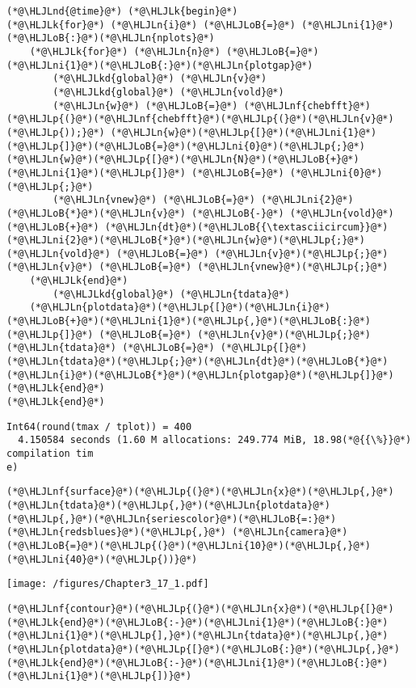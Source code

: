 \documentclass[12pt,a4paper]{article}
\newcommand{\HLJLk}[1]{\textcolor[RGB]{148,91,176}{\textbf{#1}}}
\newcommand{\HLJLkd}[1]{\textcolor[RGB]{214,102,97}{\textit{#1}}}
\newcommand{\HLJLn}[1]{#1}
\newcommand{\HLJLnd}[1]{\textcolor[RGB]{214,102,97}{#1}}
\newcommand{\HLJLnf}[1]{\textcolor[RGB]{66,102,213}{#1}}
\newcommand{\HLJLni}[1]{\textcolor[RGB]{59,151,46}{#1}}
\newcommand{\HLJLoB}[1]{\textcolor[RGB]{102,102,102}{\textbf{#1}}}
\newcommand{\HLJLp}[1]{#1}
\begin{document}
\begin{lstlisting}
(*@\HLJLnd{@time}@*) (*@\HLJLk{begin}@*)
(*@\HLJLk{for}@*) (*@\HLJLn{i}@*) (*@\HLJLoB{=}@*) (*@\HLJLni{1}@*)(*@\HLJLoB{:}@*)(*@\HLJLn{nplots}@*)
    (*@\HLJLk{for}@*) (*@\HLJLn{n}@*) (*@\HLJLoB{=}@*) (*@\HLJLni{1}@*)(*@\HLJLoB{:}@*)(*@\HLJLn{plotgap}@*)
        (*@\HLJLkd{global}@*) (*@\HLJLn{v}@*)
        (*@\HLJLkd{global}@*) (*@\HLJLn{vold}@*)
        (*@\HLJLn{w}@*) (*@\HLJLoB{=}@*) (*@\HLJLnf{chebfft}@*)(*@\HLJLp{(}@*)(*@\HLJLnf{chebfft}@*)(*@\HLJLp{(}@*)(*@\HLJLn{v}@*)(*@\HLJLp{));}@*) (*@\HLJLn{w}@*)(*@\HLJLp{[}@*)(*@\HLJLni{1}@*)(*@\HLJLp{]}@*)(*@\HLJLoB{=}@*)(*@\HLJLni{0}@*)(*@\HLJLp{;}@*) (*@\HLJLn{w}@*)(*@\HLJLp{[}@*)(*@\HLJLn{N}@*)(*@\HLJLoB{+}@*)(*@\HLJLni{1}@*)(*@\HLJLp{]}@*) (*@\HLJLoB{=}@*) (*@\HLJLni{0}@*)(*@\HLJLp{;}@*)
        (*@\HLJLn{vnew}@*) (*@\HLJLoB{=}@*) (*@\HLJLni{2}@*)(*@\HLJLoB{*}@*)(*@\HLJLn{v}@*) (*@\HLJLoB{-}@*) (*@\HLJLn{vold}@*) (*@\HLJLoB{+}@*) (*@\HLJLn{dt}@*)(*@\HLJLoB{{\textasciicircum}}@*)(*@\HLJLni{2}@*)(*@\HLJLoB{*}@*)(*@\HLJLn{w}@*)(*@\HLJLp{;}@*) (*@\HLJLn{vold}@*) (*@\HLJLoB{=}@*) (*@\HLJLn{v}@*)(*@\HLJLp{;}@*) (*@\HLJLn{v}@*) (*@\HLJLoB{=}@*) (*@\HLJLn{vnew}@*)(*@\HLJLp{;}@*)
    (*@\HLJLk{end}@*)
        (*@\HLJLkd{global}@*) (*@\HLJLn{tdata}@*)
    (*@\HLJLn{plotdata}@*)(*@\HLJLp{[}@*)(*@\HLJLn{i}@*)(*@\HLJLoB{+}@*)(*@\HLJLni{1}@*)(*@\HLJLp{,}@*)(*@\HLJLoB{:}@*)(*@\HLJLp{]}@*) (*@\HLJLoB{=}@*) (*@\HLJLn{v}@*)(*@\HLJLp{;}@*) (*@\HLJLn{tdata}@*) (*@\HLJLoB{=}@*) (*@\HLJLp{[}@*)(*@\HLJLn{tdata}@*)(*@\HLJLp{;}@*)(*@\HLJLn{dt}@*)(*@\HLJLoB{*}@*)(*@\HLJLn{i}@*)(*@\HLJLoB{*}@*)(*@\HLJLn{plotgap}@*)(*@\HLJLp{]}@*)
(*@\HLJLk{end}@*)
(*@\HLJLk{end}@*)
\end{lstlisting}

\begin{lstlisting}
Int64(round(tmax / tplot)) = 400
  4.150584 seconds (1.60 M allocations: 249.774 MiB, 18.98(*@{{\%}}@*) compilation tim
e)
\end{lstlisting}


\begin{lstlisting}
(*@\HLJLnf{surface}@*)(*@\HLJLp{(}@*)(*@\HLJLn{x}@*)(*@\HLJLp{,}@*)(*@\HLJLn{tdata}@*)(*@\HLJLp{,}@*)(*@\HLJLn{plotdata}@*)(*@\HLJLp{,}@*)(*@\HLJLn{seriescolor}@*)(*@\HLJLoB{=:}@*)(*@\HLJLn{redsblues}@*)(*@\HLJLp{,}@*) (*@\HLJLn{camera}@*)(*@\HLJLoB{=}@*)(*@\HLJLp{(}@*)(*@\HLJLni{10}@*)(*@\HLJLp{,}@*)(*@\HLJLni{40}@*)(*@\HLJLp{))}@*)
\end{lstlisting}

\texttt{[image: /figures/Chapter3\_17\_1.pdf]}

\begin{lstlisting}
(*@\HLJLnf{contour}@*)(*@\HLJLp{(}@*)(*@\HLJLn{x}@*)(*@\HLJLp{[}@*)(*@\HLJLk{end}@*)(*@\HLJLoB{:-}@*)(*@\HLJLni{1}@*)(*@\HLJLoB{:}@*)(*@\HLJLni{1}@*)(*@\HLJLp{],}@*)(*@\HLJLn{tdata}@*)(*@\HLJLp{,}@*)(*@\HLJLn{plotdata}@*)(*@\HLJLp{[}@*)(*@\HLJLoB{:}@*)(*@\HLJLp{,}@*)(*@\HLJLk{end}@*)(*@\HLJLoB{:-}@*)(*@\HLJLni{1}@*)(*@\HLJLoB{:}@*)(*@\HLJLni{1}@*)(*@\HLJLp{])}@*)
\end{lstlisting}
\end{document}
